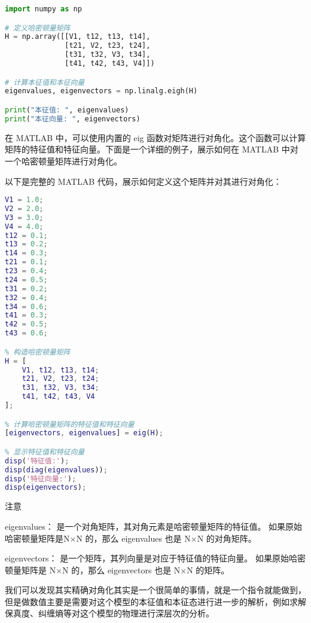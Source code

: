\begin{lstlisting}[language=python]
import numpy as np

# 定义哈密顿量矩阵
H = np.array([[V1, t12, t13, t14],
              [t21, V2, t23, t24],
              [t31, t32, V3, t34],
              [t41, t42, t43, V4]])

# 计算本征值和本征向量
eigenvalues, eigenvectors = np.linalg.eigh(H)

print("本征值: ", eigenvalues)
print("本征向量: ", eigenvectors)

\end{lstlisting}
在 MATLAB 中，可以使用内置的 eig 函数对矩阵进行对角化。这个函数可以计算矩阵的特征值和特征向量。下面是一个详细的例子，展示如何在 MATLAB 中对一个哈密顿量矩阵进行对角化。

以下是完整的 MATLAB 代码，展示如何定义这个矩阵并对其进行对角化：

\begin{lstlisting}[language=matlab]
% 定义哈密顿量矩阵的元素
V1 = 1.0;
V2 = 2.0;
V3 = 3.0;
V4 = 4.0;
t12 = 0.1;
t13 = 0.2;
t14 = 0.3;
t21 = 0.1;
t23 = 0.4;
t24 = 0.5;
t31 = 0.2;
t32 = 0.4;
t34 = 0.6;
t41 = 0.3;
t42 = 0.5;
t43 = 0.6;

% 构造哈密顿量矩阵
H = [
    V1, t12, t13, t14;
    t21, V2, t23, t24;
    t31, t32, V3, t34;
    t41, t42, t43, V4
];

% 计算哈密顿量矩阵的特征值和特征向量
[eigenvectors, eigenvalues] = eig(H);

% 显示特征值和特征向量
disp('特征值:');
disp(diag(eigenvalues));
disp('特征向量:');
disp(eigenvectors);

\end{lstlisting}
注意

eigenvalues：
是一个对角矩阵，其对角元素是哈密顿量矩阵的特征值。
如果原始哈密顿量矩阵是N×N 的，那么 eigenvalues 也是 N×N 的对角矩阵。

eigenvectors：
是一个矩阵，其列向量是对应于特征值的特征向量。
如果原始哈密顿量矩阵是 N×N 的，那么 eigenvectors 也是 N×N 的矩阵。

我们可以发现其实精确对角化其实是一个很简单的事情，就是一个指令就能做到，但是做数值主要是需要对这个模型的本征值和本征态进行进一步的解析，例如求解保真度、纠缠熵等对这个模型的物理进行深层次的分析。